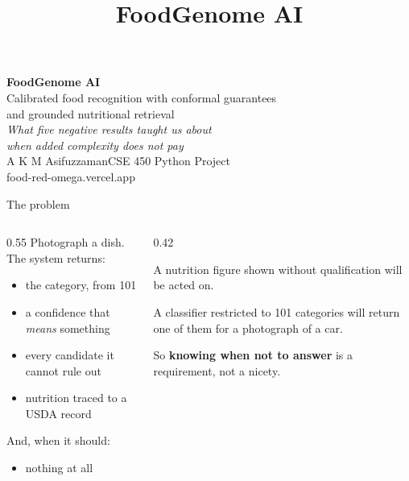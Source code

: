 \documentclass[aspectratio=169,11pt]{beamer}
\title{FoodGenome AI}
\author{\StudentName}
\newcommand{\StudentName}{A K M Asifuzzaman}
\newcommand{\CourseCode}{CSE 450 Python Project}
\begin{document}
\begin{frame}[plain]
\vspace{1.2em}
{\Huge\bfseries FoodGenome AI}\\[0.5em]
{\large Calibrated food recognition with conformal guarantees\\and grounded nutritional retrieval}\\[1.6em]
{\color{dim}\itshape What five negative results taught us about\\when added complexity does not pay}\\[2em]
{\small \StudentName \quad\textbullet\quad \CourseCode}\\[0.4em]
{\scriptsize\color{dim} food-red-omega.vercel.app}
\end{frame}

\begin{frame}{The problem}
\begin{columns}[T]
\begin{column}{0.55\textwidth}
Photograph a dish. The system returns:
\begin{itemize}
  \item the category, from 101
  \item a confidence that \emph{means} something
  \item every candidate it cannot rule out
  \item nutrition traced to a USDA record
\end{itemize}
\vspace{0.8em}
And, when it should:
\begin{itemize}
  \item[] \alert{nothing at all}
\end{itemize}
\end{column}
\begin{column}{0.42\textwidth}
\vspace{0.5em}
{\color{dim}\small
A nutrition figure shown without qualification will be acted on.

A classifier restricted to 101 categories will return one of them for a photograph of a car.

\vspace{0.6em}
So \textbf{knowing when not to answer} is a requirement, not a nicety.}
\end{column}
\end{columns}
\end{frame}
\end{document}
